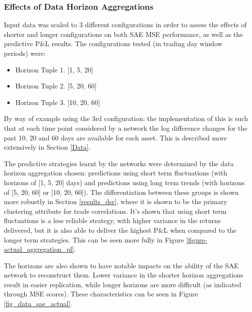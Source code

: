 \documentclass[a4paper,11pt,oneside]{article}
\theoremstyle{plain}
\theoremstyle{definition}
\begin{document}
	
	\subsubsection{Effects of Data Horizon Aggregations}
	
	Input data was scaled to 3 different configurations in order to assess the effects of shorter and longer configurations on both SAE MSE performance, as well as the predictive P\&L results. The configurations tested (in trading day window periods) were:
	
	\begin{itemize}
		\item[] Horizon Tuple 1. [1, 5, 20]
		\item[] Horizon Tuple 2. [5, 20, 60]
		\item[] Horizon Tuple 3. [10, 20, 60]
	\end{itemize}
	
	By way of example using the 3rd configuration: the implementation of this is such that at each time point considered by a network the log difference changes for the past 10, 20 and 60 days are available for each asset. This is described more extensively in Section \ref{Data}.\newline
	
	The predictive strategies learnt by the networks were determined by the data horizon aggregation chosen: predictions using short term fluctuations (with horizons of [1, 5, 20] days) and predictions using long term trends (with horizons of [5, 20, 60] or [10, 20, 60]). The differentiation between these groups is shown more robustly in Section \ref{results_dsr}, where it is shown to be the primary clustering attribute for trade correlations. It's shown that using short term fluctuations is a less reliable strategy, with higher variance in the returns delivered, but it is also able to deliver the highest P\&L when compared to the longer term strategies. This can be seen more fully in Figure \ref{figure-actual_aggregation_pl}. \newline

	The horizons are also shown to have notable impacts on the ability of the SAE network to reconstruct them. Lower variance in the shorter horizon aggregations result in easier replication, while longer horizons are more difficult (as indicated through MSE scores). These characteristics can be seen in Figure \ref{fig_data_sae_actual}.	
	
\end{document}
